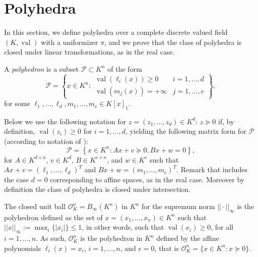 \documentclass{elsarticle}
\theoremstyle{plain}
\theoremstyle{definition}
\newcommand{\PP}{\mathcal{P}}
\DeclareMathOperator{\val}{val}
\newcommand{\OK}{\mathcal{O}_K}
\begin{document}
\section{Polyhedra}
\label{sec:polyhedra}

In this section, we define polyhedra over a complete discrete valued field $(K,\val)$
with a uniformizer $\pi$, and we prove that the class of polyhedra is closed under
linear transformations, as in the real case. 

\begin{definition}
  \label{def_polyhedra}
  A \emph{polyhedron} is a subset $\PP \subset K^n$ of the form
  \begin{equation}\label{eq_def_polyhedra}
  \PP =
  \left\{
  x \in K^n :
  \begin{array}{ll}
    \val(\ell_i(x)) \geq 0 & i=1,\ldots,d \\
    \val(m_j(x)) = +\infty & j=1,\ldots,e
  \end{array}
    \right\},
  \end{equation}
  for some $\ell_1,\ldots,\ell_d,m_1,\ldots,m_e \in K[x]_1$.
\end{definition}

Below we use the following notation for $z = (z_1,\ldots,z_d) \in K^d$:
$z \succeq 0$ if, by definition, $\val(z_i)\geq 0$ for $i=1,\ldots,d$,
yielding the following matrix form for $\PP$ (according to notation of
):
\begin{equation}\label{eq_def_polyhedra_compact}
  \PP = \left\lbrace x \in K^n : Ax+v \succeq 0, Bx+w = 0 \right\rbrace,
\end{equation}
for $A \in K^{d \times n}$, $v \in K^d$, $B \in K^{e \times n}$, and
$w \in K^e$ such that $Ax+v = (\ell_1,\ldots,\ell_d)^T$
and $Bx+w = (m_1,\ldots,m_e)^T$.
Remark that  includes the case $d=0$ corresponding to affine spaces, as in the real case.
Moreover by definition the class of polyhedra is closed under intersection.

\begin{example}
  The {closed unit ball} $\OK^n=B_\infty(K^n)$ in $K^n$ for the supremum norm $||\cdot||_{\infty}$ is the
  polyhedron defined as the set of $x=(x_1,\ldots,x_n) \in K^n$ such that $||x||_{\infty} :=
  \max_i\{\vert x_i \vert\} \leq 1$, in other words, such that $\val(x_i) \geq 0$, for all $i=1, \ldots, n$.
  As such, $\OK^n$ is the polyhedron in $K^n$ defined by the affine polynomials
  $\ell_i(x)=x_i$, $i=1,\ldots, n$, and $e=0$, that is $\OK^n = \{x \in K^n : x \succeq 0\}$.
\end{example}
\end{document}
